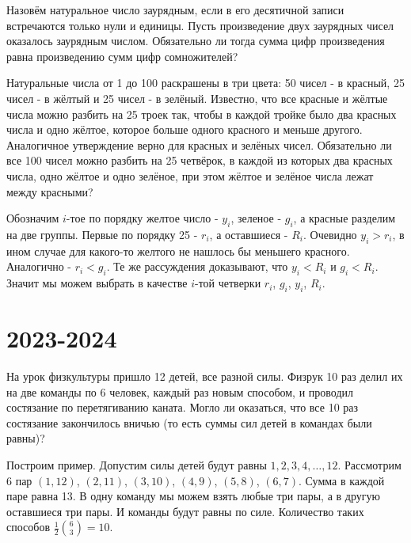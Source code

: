 \documentclass[11pt, a4paper]{template}
\begin{document}
\begin{exercise}
Назовём натуральное число заурядным, если в его десятичной записи встречаются
только нули и единицы. Пусть произведение двух заурядных чисел оказалось заурядным числом. Обязательно ли тогда сумма цифр произведения равна произведению сумм цифр сомножителей?
\end{exercise}

\begin{exercise}
Натуральные числа от 1 до 100 раскрашены в три цвета: 50 чисел - в красный, 25
чисел - в жёлтый и 25 чисел - в зелёный. Известно, что все красные и жёлтые числа можно разбить на 25 троек так, чтобы в каждой тройке было два красных числа и одно жёлтое, которое больше одного красного и меньше другого. Аналогичное утверждение верно для красных и зелёных чисел. Обязательно ли все 100 чисел можно разбить на 25 четвёрок, в каждой из которых два красных числа, одно жёлтое и одно зелёное, при этом жёлтое и зелёное числа лежат между красными?
\end{exercise}

\begin{solution}
Обозначим $i$-тое по порядку желтое число - $y_{i}$, зеленое - $g_{i}$, а красные разделим на две группы. Первые по порядку 25 - $r_{i}$, а оставшиеся - $R_{i}$. Очевидно $y_{i} > r_{i}$, в ином случае для какого-то желтого не нашлось бы меньшего красного. Аналогично - $r_{i} < g_{i}$. Те же рассуждения доказывают, что $y_{i} < R_{i}$ и $g_{i} < R_{i}$. Значит мы можем выбрать в качестве $i$-той четверки $r_{i}$, $g_{i}$, $y_{i}$, $R_{i}$.
\end{solution}

\chapter{2023-2024}

\begin{exercise}
На урок физкультуры пришло 12 детей, все разной силы. Физрук 10 раз делил их на две команды
по 6 человек, каждый раз новым способом, и проводил состязание по перетягиванию каната.
Могло ли оказаться, что все 10 раз состязание закончилось вничью (то есть суммы сил детей в
командах были равны)?
\end{exercise}

\begin{solution}
Построим пример. Допустим силы детей будут равны $1, 2, 3, 4, \dots, 12$. Рассмотрим 6 пар $(1, 12)$, $(2, 11)$, $(3, 10)$, $(4, 9)$, $(5, 8)$, $(6, 7)$. Сумма в каждой паре равна 13. В одну команду мы можем взять любые три пары, а в другую оставшиеся три пары. И команды будут равны по силе. Количество таких способов $\frac{1}{2} \binom{6}{3} = 10$.
\end{solution}
\end{document}
